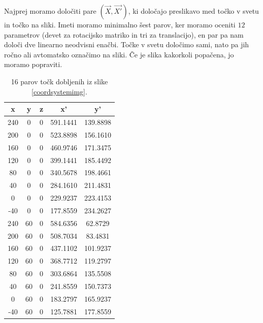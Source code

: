 \documentclass[a4paper, 12pt]{book}
\begin{document}
Najprej moramo določiti pare $(\vec{X}, \vec{X'})$, ki določajo preslikavo med točko v svetu in točko na sliki. Imeti moramo minimalno šest parov, ker moramo oceniti $12$ parametrov (devet za rotacijsko matriko in tri za translacijo), en par pa nam določi dve linearno neodvisni enačbi. Točke v svetu določimo sami, nato pa jih ročno ali avtomatsko označimo na sliki. Če je slika kakorkoli popačena, jo moramo popraviti.

\begin{table}[H]
\centering
\begin{tabular}{| c | c | c | c | c |}
\hline
x & y & z & x' & y' \\
\hline
240 & 0 & 0 & 591.1441 & 139.8898 \\
200 & 0 & 0 & 523.8898 & 156.1610 \\
160 & 0 & 0 & 460.9746 & 171.3475 \\
120 & 0 & 0 & 399.1441 & 185.4492 \\
80 & 0 & 0 & 340.5678 & 198.4661 \\
40 & 0 & 0 & 284.1610 & 211.4831 \\
0 & 0 & 0 & 229.9237 & 223.4153 \\
-40 & 0 & 0 & 177.8559 & 234.2627 \\
240 & 60 & 0 & 584.6356 & 62.8729 \\
200 & 60 & 0 & 508.7034 & 83.4831 \\
160 & 60 & 0 & 437.1102 & 101.9237 \\
120 & 60 & 0 & 368.7712 & 119.2797 \\
80 & 60 & 0 & 303.6864 & 135.5508 \\
40 & 60 & 0 & 241.8559 & 150.7373 \\
0 & 60 & 0 & 183.2797 & 165.9237 \\
-40 & 60 & 0 & 125.7881 & 177.8559 \\
\hline
\end{tabular}
\caption{16 parov točk dobljenih iz slike \ref{coordsystemimg}.}
\label{pointpairs}
\end{table}
\end{document}
